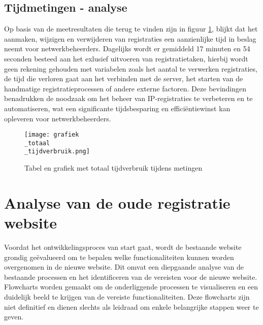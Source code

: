 \subsection{Tijdmetingen - analyse}
Op basis van de meetresultaten die terug te vinden zijn in figuur \ref{fig:tijdverbruik_metingen}, blijkt dat het aanmaken, wijzigen en verwijderen van registraties een aanzienlijke tijd in beslag neemt voor netwerkbeheerders. Dagelijks wordt er gemiddeld 17 minuten en 54 seconden besteed aan het exlusief uitvoeren van registratietaken, hierbij wordt geen rekening gehouden met variabelen zoals het aantal te verwerken registraties, de tijd die verloren gaat aan het verbinden met de server, het starten van de handmatige registratieprocessen of andere externe factoren. Deze bevindingen benadrukken de noodzaak om het beheer van IP-registraties te verbeteren en te automatiseren, wat een significante tijdsbesparing en efficiëntiewinst kan opleveren voor netwerkbeheerders.

\begin{figure}[H]
    \texttt{[image: grafiek\\\_totaal\\\_tijdverbruik.png]}
    \caption{Tabel en grafiek met totaal tijdverbruik tijdens metingen}
    \label{fig:tijdverbruik_metingen}
\end{figure}

\section{Analyse van de oude registratie website}
Voordat het ontwikkelingsproces van start gaat, wordt de bestaande website grondig geëvalueerd om te bepalen welke functionaliteiten kunnen worden overgenomen in de nieuwe website. Dit omvat een diepgaande analyse van de bestaande processen en het identificeren van de vereisten voor de nieuwe website. Flowcharts worden gemaakt om de onderliggende processen te visualiseren en een duidelijk beeld te krijgen van de vereiste functionaliteiten. Deze flowcharts zijn niet definitief en dienen slechts als leidraad om enkele belangrijke stappen weer te geven.

